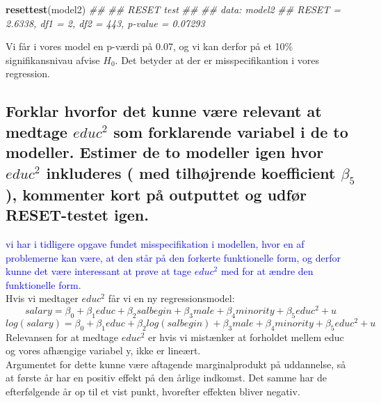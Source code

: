 \documentclass[
  10pt,
]{article}
\newenvironment{Shaded}{\begin{snugshade}}{\end{snugshade}}
\newcommand{\CommentTok}[1]{\textcolor[rgb]{0.56,0.35,0.01}{\textit{#1}}}
\newcommand{\KeywordTok}[1]{\textcolor[rgb]{0.13,0.29,0.53}{\textbf{#1}}}
\newcommand{\NormalTok}[1]{#1}
\begin{document}
\begin{Shaded}
\begin{Highlighting}[]
\KeywordTok{resettest}\NormalTok{(model2)}
\CommentTok{## }
\CommentTok{##  RESET test}
\CommentTok{## }
\CommentTok{## data:  model2}
\CommentTok{## RESET = 2.6338, df1 = 2, df2 = 443, p-value = 0.07293}
\end{Highlighting}
\end{Shaded}

Vi får i vores model en p-værdi på 0.07, og vi kan derfor på et 10\%
signifikansnivau afvise \(H_0\). Det betyder at der er misspecifikantion
i vores regression. \newpage

\hypertarget{forklar-hvorfor-det-kunne-vuxe6re-relevant-at-medtage-educ2-som-forklarende-variabel-i-de-to-modeller.-estimer-de-to-modeller-igen-hvor-educ2-inkluderes-med-tilhuxf8jrende-koefficient-beta_5-kommenter-kort-puxe5-outputtet-og-udfuxf8r-reset-testet-igen.}{%
\subsection{\texorpdfstring{Forklar hvorfor det kunne være relevant at
medtage \(educ^2\) som forklarende variabel i de to modeller. Estimer de
to modeller igen hvor \(educ^2\) inkluderes ( med tilhøjrende
koefficient \(\beta_5\) ), kommenter kort på outputtet og udfør
RESET-testet
igen.}{Forklar hvorfor det kunne være relevant at medtage educ\^{}2 som forklarende variabel i de to modeller. Estimer de to modeller igen hvor educ\^{}2 inkluderes ( med tilhøjrende koefficient \textbackslash beta\_5 ), kommenter kort på outputtet og udfør RESET-testet igen.}}\label{forklar-hvorfor-det-kunne-vuxe6re-relevant-at-medtage-educ2-som-forklarende-variabel-i-de-to-modeller.-estimer-de-to-modeller-igen-hvor-educ2-inkluderes-med-tilhuxf8jrende-koefficient-beta_5-kommenter-kort-puxe5-outputtet-og-udfuxf8r-reset-testet-igen.}}

\leavevmode

\textcolor{blue}{vi har i tidligere opgave fundet misspecifikation i modellen, hvor en af problemerne kan være, at den står på den forkerte funktionelle form, og derfor kunne det være interessant at prøve at tage $educ^2$ med for at ændre den funktionelle form.}\\
Hvis vi medtager \(educ^2\) får vi en ny regressionsmodel:
\[ salary = \beta_0+\beta_1educ+\beta_2salbegin+\beta_3male+\beta_4minority+\beta_5educ^2+u \tag{1} \]
\[ log(salary)=\beta_0+\beta_1educ+\beta_2log(salbegin)+\beta_3male+\beta_4minority+\beta_5educ^2+u \tag{2} \]
Relevansen for at medtage \(educ^2\) er hvis vi mistænker at forholdet
mellem educ og vores afhængige variabel y, ikke er lineært.\\
Argumentet for dette kunne være aftagende marginalprodukt på uddannelse,
så at første år har en positiv effekt på den årlige indkomst. Det samme
har de efterfølgende år op til et vist punkt, hvorefter effekten bliver
negativ.
\end{document}
